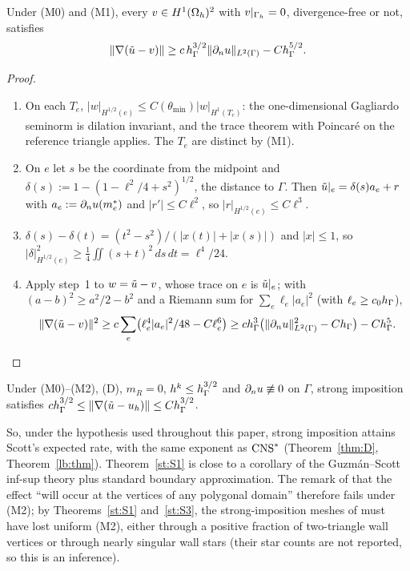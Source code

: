 \begin{theorem}\label{st:S2}
Under (M0) and (M1), every $v\in H^1(\Omega_h)^2$ with $v|_{\Gamma_h}=0$, divergence-free or not, satisfies
\[
\lVert \nabla(\tilde u-v)\rVert\ge c\,h_\Gamma^{3/2}\lVert \partial_n u\rVert_{L^2(\Gamma)}-Ch_\Gamma^{5/2}.
\]
\end{theorem}

\begin{proof}
\begin{enumerate}
\item On each $T_e$, $|w|_{H^{1/2}(e)}\le C(\theta_{\min})|w|_{H^1(T_e)}$: the one-dimensional Gagliardo seminorm is dilation invariant, and the trace theorem with Poincar\'e on the reference triangle applies. The $T_e$ are distinct by (M1).
\item On $e$ let $s$ be the coordinate from the midpoint and $\delta(s):=1-(1-\ell^2/4+s^2)^{1/2}$, the distance to $\Gamma$. Then $\tilde u|_e=\delta(s)a_e+r$ with $a_e:=\partial_n u(m_e^\ast)$ and $|r'|\le C\ell^2$, so $|r|_{H^{1/2}(e)}\le C\ell^3$.
\item $\delta(s)-\delta(t)=(t^2-s^2)/(|x(t)|+|x(s)|)$ and $|x|\le1$, so $|\delta|^2_{H^{1/2}(e)}\ge\frac14\iint(s+t)^2\,ds\,dt=\ell^4/24$.
\item Apply step~1 to $w=\tilde u-v$, whose trace on $e$ is $\tilde u|_e$; with $(a-b)^2\ge a^2/2-b^2$ and a Riemann sum for $\sum_e\ell_e|a_e|^2$ (with $\ell_e\ge c_0h_\Gamma$),
\[
\lVert \nabla(\tilde u-v)\rVert^2\ge c\sum_e\bigl(\ell_e^4|a_e|^2/48-C\ell_e^6\bigr)\ge ch_\Gamma^3\bigl(\lVert \partial_n u\rVert^2_{L^2(\Gamma)}-Ch_\Gamma\bigr)-Ch_\Gamma^5.\qedhere
\]
\end{enumerate}
\end{proof}

\begin{corollary}\label{st:two0}
Under (M0)--(M2), (D), $m_R=0$, $h^k\le h_\Gamma^{3/2}$ and $\partial_n u\not\equiv0$ on $\Gamma$, strong imposition satisfies $ch_\Gamma^{3/2}\le\lVert \nabla(\tilde u-u_h)\rVert\le Ch_\Gamma^{3/2}$.
\end{corollary}

So, under the hypothesis used throughout this paper, strong imposition attains Scott's expected rate, with the same exponent as $\mathrm{CNS}^\ast$ (Theorem~\ref{thm:D}, Theorem~\ref{lb:thm}). Theorem~\ref{st:S1} is close to a corollary of the Guzm\'an--Scott inf-sup theory plus standard boundary approximation. The remark of \cite{GjerdeScott2024} that the effect ``will occur at the vertices of any polygonal domain'' therefore fails under (M2); by Theorems~\ref{st:S1} and~\ref{st:S3}, the strong-imposition meshes of \cite{GjerdeScott2024} must have lost uniform (M2), either through a positive fraction of two-triangle wall vertices or through nearly singular wall stars (their star counts are not reported, so this is an inference).


